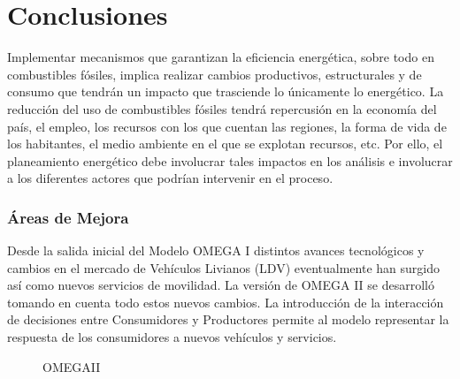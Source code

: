 \chapter{Conclusiones}

Implementar mecanismos que garantizan la eficiencia energética, sobre todo en combustibles fósiles, implica realizar cambios productivos, estructurales y de consumo que tendrán un impacto que trasciende lo únicamente lo energético. La reducción del uso de combustibles fósiles tendrá repercusión en la economía del país, el empleo, los recursos con los que cuentan las regiones, la forma de vida de los habitantes, el medio ambiente en el que se explotan recursos, etc. Por ello, el planeamiento energético debe involucrar tales impactos en los análisis e involucrar a los diferentes actores que podrían intervenir en el proceso.

\subsection{Áreas de Mejora}

Desde la salida inicial del Modelo OMEGA I distintos avances tecnológicos y cambios en el mercado de Vehículos Livianos (LDV) eventualmente han surgido así como nuevos servicios de movilidad. La versión de OMEGA II se desarrolló tomando en cuenta todo estos nuevos cambios. La introducción de la interacción de decisiones entre Consumidores y Productores permite al modelo representar la respuesta de los consumidores a nuevos vehículos y servicios.

\begin{figure}[htbp]
   \centering
   
    \caption{OMEGAII}
    \label{fig:omega2}
\end{figure}
